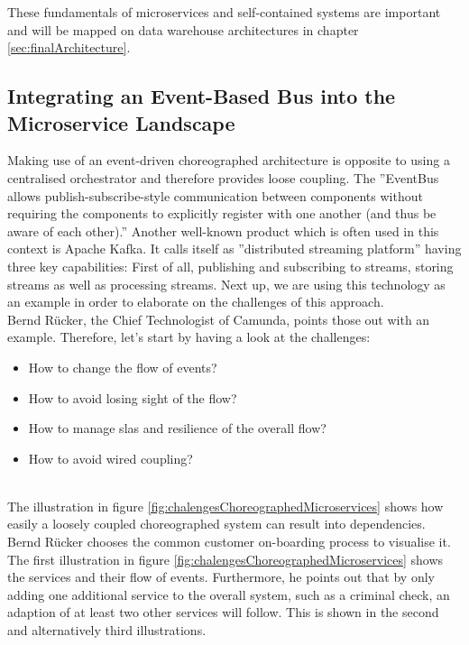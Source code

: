These fundamentals of microservices and self-contained systems are important and will be mapped on data warehouse architectures in chapter \ref{sec:finalArchitecture}.

\subsection{Integrating an Event-Based Bus into the Microservice  Landscape}
\label{sec:eventBasedArchitecture}
Making use of an event-driven choreographed architecture is opposite to using a centralised orchestrator and therefore provides loose coupling. The ''EventBus allows publish-subscribe-style communication between components without requiring the components to explicitly register with one another (and thus be aware of each other).'' \cite{EventBusExplained} \newline
Another well-known product which is often used in this context is Apache Kafka. It calls itself as ''distributed streaming platform'' having three key capabilities: First of all, publishing and subscribing to streams, storing streams as well as processing streams.\cite{kafka}
Next up, we are using this technology as an example in order to elaborate on the challenges of this approach.\newline
\\
Bernd Rücker, the Chief Technologist of Camunda, points those out with an example. Therefore, let's start by having a look at the challenges:
\begin{itemize}
    \item How to change the flow of events?
    \item How to avoid losing sight of the flow?
    \item How to manage \acrshort{sla}s and resilience of the overall flow?
    \item How to avoid wired coupling?
\end{itemize}
\cite{eventDrivenMicroservices}\newline
\\
The illustration in figure \ref{fig:chalengesChoreographedMicroservices} shows how easily a loosely coupled choreographed system can result into dependencies. Bernd Rücker chooses the common customer on-boarding process to visualise it. The first illustration in figure \ref{fig:chalengesChoreographedMicroservices} shows the services and their flow of events. Furthermore, he points out that by only adding one additional service to the overall system, such as a criminal check, an adaption of at least two other services will follow. This is shown in the second and alternatively third illustrations. \cite{eventDrivenMicroservices}\newline
